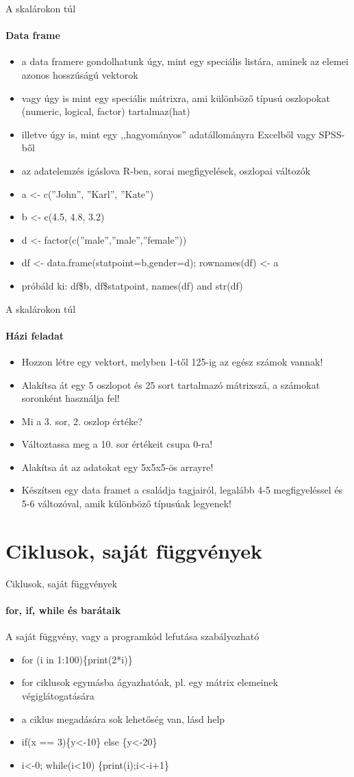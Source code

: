 \documentclass[10pt]{beamer}
\begin{document}
\begin{frame}{A skalárokon túl}
\framesubtitle{Data frame}
\begin{itemize}
\item a data framere gondolhatunk úgy, mint egy speciális listára, aminek az elemei azonos hosszúságú vektorok
\item vagy úgy is mint egy speciális mátrixra, ami különböző típusú oszlopokat (numeric, logical, factor) tartalmaz(hat)
\item illetve úgy is, mint egy ,,hagyományos'' adatállományra Excelből vagy SPSS-ből
\item az adatelemzés igáslova R-ben, sorai megfigyelések, oszlopai változók
\item a <- c(''John'', ''Karl'', ''Kate'')
\item b <- c(4.5, 4.8, 3.2)
\item d <- factor(c(''male'',''male'',''female''))
\item df <- data.frame(statpoint=b,gender=d); rownames(df) <- a
\item próbáld ki: df\$b, df\$statpoint, names(df) and str(df)
\end{itemize}
\end{frame}

\begin{frame}{A skalárokon túl}
\framesubtitle{Házi feladat}
\begin{itemize}
\item Hozzon létre egy vektort, melyben 1-től 125-ig az egész számok vannak!
\item Alakítsa át egy 5 oszlopot és 25 sort tartalmazó mátrixszá, a számokat soronként használja fel!
\item Mi a 3. sor, 2. oszlop értéke?
\item Változtassa meg a 10. sor értékeit csupa 0-ra!
\item Alakítsa át az adatokat egy 5x5x5-ös arrayre!
\item Készítsen egy data framet a családja tagjairól, legalább 4-5 megfigyeléssel és 5-6 változóval, amik különböző típusúak legyenek!
\end{itemize}
\end{frame}

\section{Ciklusok, saját függvények}

\begin{frame}{Ciklusok, saját függvények}
\framesubtitle{for, if, while és barátaik}
A saját függvény, vagy a programkód lefutása szabályozható
\begin{itemize}
\item for (i in 1:100)\{print(2*i)\}
\item for ciklusok egymásba ágyazhatóak, pl. egy mátrix elemeinek végiglátogatására
\item a ciklus megadására sok lehetőség van, lásd help
\item if(x == 3)\{y<-10\} else \{y<-20\}
\item i<-0; while(i<10) \{print(i);i<-i+1\}
\end{itemize}
\end{frame}
\end{document}
